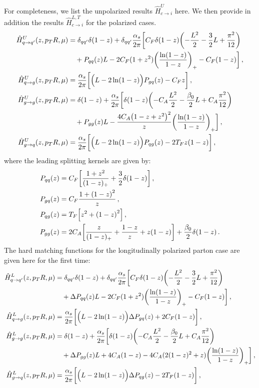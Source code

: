 \documentclass[a4paper, 11 pt]{article}
\begin{document}
For completeness, we list the unpolarized results $\hat{H}_{c \to i}^{U}$ here. We then provide in addition the results $\hat{H}_{c \to i}^{L,T}$ for the polarized cases. 
\begin{align}
\hat{H}_{q \to q'}^U (z, p_TR, \mu) 
& = \delta _{qq'} \delta (1-z)
+ \delta _{qq'} \frac{\alpha _s}{2 \pi} \bigg[C_F \delta (1-z) \pqty{-\frac{L^2}{2} - \frac{3}{2} L + \frac{\pi ^2}{12}}
\nonumber \\
& \quad
+ P_{qq}(z) L -2 C_F (1+z^2) \pqty{\frac{\ln(1-z)}{1-z}}_+ - C_F (1-z) \bigg]
\, , \\
\hat{H}_{q \to g}^U (z, p_TR, \mu) 
& =
\frac{\alpha _s}{2 \pi} \bigg[\Big(L - 2 \ln(1-z) \Big) P_{gq}(z) - C_F z \bigg]
\, , \\
\hat{H}_{g \to g}^U (z, p_TR, \mu)
& =
\delta(1-z)
+
\frac{\alpha _s}{2 \pi} \bigg[\delta (1-z) \pqty{-C_A \frac{L^2}{2} - \frac{\beta _0}{2} L + C_A \frac{\pi ^2}{12}}
\nonumber \\
& \quad +
P_{gg}(z) L - \frac{4 C_A \pqty{1 - z + z^2}^2}{z} \pqty{\frac{\ln(1-z)}{1-z}}_+ \bigg]
\, , \\
\hat{H}_{g \to q}^U (z, p_TR, \mu)
& =
\frac{\alpha _s}{2 \pi} \bigg[\Big(L - 2 \ln(1-z) \Big) P_{qg}(z) - 2 T_F z (1-z) \bigg]
\, ,
\end{align}
where the leading splitting kernels are given by:
\begin{align}
P_{qq}(z)
& =
C_F \bqty{\frac{1 + z^2}{(1-z)_+} + \frac{3}{2} \delta (1-z)}
\, , \\
P_{gq}(z)
& =
C_F \frac{1 + \pqty{1 - z}^2}{z}
\, , \\
P_{qg}(z)
& =
T_F \bqty{z^2 + \pqty{1-z}^2}
\, , \\
P_{gg}(z)
& =
2 C_A \bqty{\frac{z}{(1-z)_+} + \frac{1-z}{z} + z \pqty{1-z}}
+
\frac{\beta _0}{2} \delta (1-z)
\, .
\end{align}
The hard matching functions for the longitudinally polarized parton case are given here for the first time:
\begin{align}
\hat{H}^L_{q \to q'}(z, p_TR, \mu) 
& =
\delta _{qq'} \delta (1-z)
+
\delta _{qq'} \frac{\alpha _s}{2 \pi} \bigg[C_F \delta (1-z) \pqty{-\frac{L^2}{2} - \frac{3}{2} L + \frac{\pi ^2}{12}}
\nonumber \\
& \quad +
\Delta P_{qq}(z) L -2 C_F (1+z^2) \pqty{\frac{\ln(1-z)}{1-z}}_+ - C_F (1-z) \bigg]
\, , \\
\hat{H}^L_{q \to g} (z, p_TR, \mu) 
& = \frac{\alpha _s}{2 \pi} \bigg[\Big(L - 2 \ln(1-z) \Big) \Delta P_{gq}(z) + 2 C_F (1-z) \bigg]
\, , \\
\hat{H}^L_{g \to g} (z, p_TR, \mu)
& =
\delta(1-z)
+
\frac{\alpha _s}{2 \pi} \bigg[\delta (1-z) \pqty{-C_A \frac{L^2}{2} - \frac{\beta _0}{2} L + C_A \frac{\pi ^2}{12}}
\nonumber \\
& \quad +
\Delta P_{gg}(z) L + 4 C_A (1-z) - 4 C_A (2 (1-z)^2 + z) \pqty{\frac{\ln(1-z)}{1-z}}_+ \bigg]
\, , \\
\hat{H}^L_{g \to q} (z, p_TR, \mu)
& =
\frac{\alpha _s}{2 \pi} \bigg[\Big(L - 2 \ln(1-z) \Big) \Delta P_{qg}(z) - 2 T_F (1-z) \bigg]
\, , 
\end{align}
\end{document}
